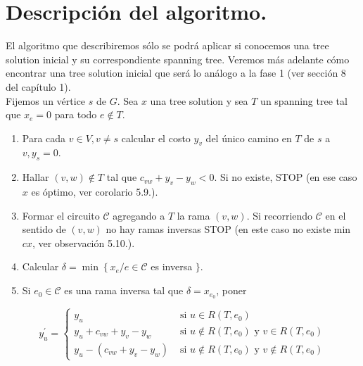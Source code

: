 \documentclass[10pt]{article}
\begin{document}
\section*{Descripción del algoritmo.}
El algoritmo que describiremos sólo se podrá aplicar si conocemos una tree solution inicial y su correspondiente spanning tree. Veremos más adelante cómo encontrar una tree solution inicial que será lo análogo a la fase 1 (ver sección 8 del capítulo 1).\\
Fijemos un vértice $s$ de $G$. Sea $x$ una tree solution y sea $T$ un spanning tree tal que $x_{e}=0$ para todo $e \notin T$.

\begin{enumerate}
  \item Para cada $v \in V, v \neq s$ calcular el costo $y_{v}$ del único camino en $T$ de $s$ a $v, y_{s}=0$.
  \item Hallar $(v, w) \notin T$ tal que $c_{v w}+y_{v}-y_{w}<0$. Si no existe, STOP (en ese caso $x$ es óptimo, ver corolario 5.9.).
  \item Formar el circuito $\mathcal{C}$ agregando a $T$ la rama $(v, w)$. Si recorriendo $\mathcal{C}$ en el sentido de $(v, w)$ no hay ramas inversas STOP (en este caso no existe min $c x$, ver observación 5.10.).
  \item Calcular $\delta=\min \left\{x_{e} / e \in \mathcal{C}\right.$ es inversa $\}$.
  \item Si $e_{0} \in \mathcal{C}$ es una rama inversa tal que $\delta=x_{e_{0}}$, poner
\end{enumerate}

$$
y_{u}^{\prime}= \begin{cases}y_{u} & \text { si } u \in R\left(T, e_{0}\right) \\ y_{u}+c_{v w}+y_{v}-y_{w} & \text { si } u \notin R\left(T, e_{0}\right) \text { y } v \in R\left(T, e_{0}\right) \\ y_{u}-\left(c_{v w}+y_{v}-y_{w}\right) & \text { si } u \notin R\left(T, e_{0}\right) \text { y } v \notin R\left(T, e_{0}\right)\end{cases}
$$
\end{document}
